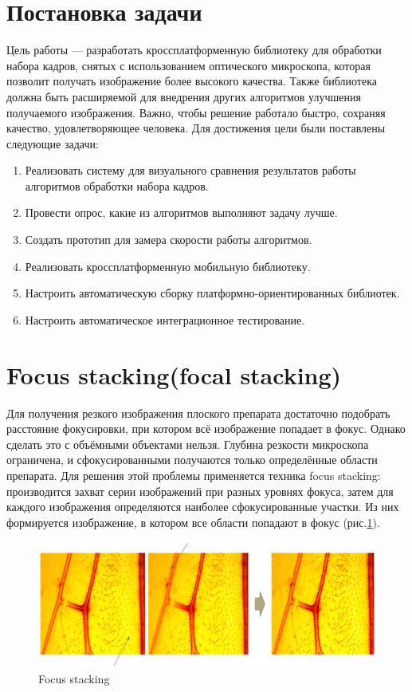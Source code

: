 \documentclass[14pt]{matmex-diploma-custom}
\begin{document}
\section{Постановка задачи}
Цель работы --- разработать кроссплатформенную библиотеку для обработки набора кадров, снятых с использованием оптического микроскопа, которая позволит получать изображение более высокого качества. Также библиотека должна быть расширяемой для внедрения других алгоритмов улучшения получаемого изображения. Важно, чтобы решение работало быстро, сохраняя качество, удовлетворяющее человека. Для достижения цели были поставлены следующие задачи:
\begin{enumerate}
    \item Реализовать систему для визуального сравнения результатов работы алгоритмов обработки набора кадров. 
    \item Провести опрос, какие из алгоритмов выполняют задачу лучше.
    \item Создать прототип для замера скорости работы алгоритмов.
    \item Реализовать кроссплатформенную мобильную библиотеку.
    \item Настроить автоматическую сборку платформно-ориентированных библиотек.
    \item Настроить автоматическое интеграционное тестирование.
\end{enumerate}


\section{Focus stacking(focal stacking)}
Для получения резкого изображения плоского препарата достаточно подобрать расстояние фокусировки, при котором всё изображение попадает в фокус. Однако сделать это с объёмными объектами нельзя. Глубина резкости микроскопа ограничена, и сфокусированными получаются только определённые области препарата. Для решения этой проблемы применяется техника focus stacking: производится захват серии изображений при разных уровнях фокуса, затем для каждого изображения определяются наиболее сфокусированные участки. Из них формируется изображение, в котором все области попадают в фокус (рис.\ref{focus_stacking1}).

\begin{figure}[h]
    \centering
    \includegraphics[width=1.0\textwidth]{figures/fs1.png}
    \caption{Focus stacking}
    \label{focus_stacking1}
\end{figure}
\end{document}
